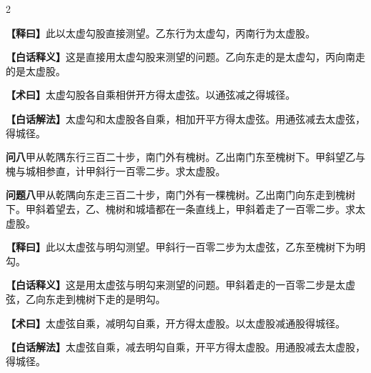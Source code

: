 \documentclass[11pt,a4paper]{article}
\newcommand{\WenQuestion}[1]{\textbf{\textcolor{classicalcolor}{#1}}}
\newcommand{\BaiQuestion}[1]{\textbf{\textcolor{moderncolor}{#1}}}
\newcommand{\WenExplain}{\textcolor{classicalcolor}{\textbf{【释曰】}}}
\newcommand{\BaiExplain}{\textcolor{moderncolor}{\textbf{【白话释义】}}}
\newcommand{\WenMethod}{\textcolor{classicalcolor}{\textbf{【术曰】}}}
\newcommand{\BaiMethod}{\textcolor{moderncolor}{\textbf{【白话解法】}}}
\begin{document}
\begin{paracol}{2}
\switchcolumn*
\begin{tcolorbox}[colback=red!5,colframe=red!30!black,boxrule=0.3pt]
\WenExplain\quad 此以太虚勾股直接测望。乙东行为太虚勾，丙南行为太虚股。
\end{tcolorbox}
\switchcolumn
\begin{tcolorbox}[colback=blue!5,colframe=blue!30!black,boxrule=0.3pt]
\BaiExplain\quad 这是直接用太虚勾股来测望的问题。乙向东走的是太虚勾，丙向南走的是太虚股。
\end{tcolorbox}

\switchcolumn*
\begin{tcolorbox}[colback=red!5,colframe=red!40!black,boxrule=0.3pt]
\WenMethod\quad 太虚勾股各自乘相併开方得太虚弦。以通弦减之得城径。
\end{tcolorbox}
\switchcolumn
\begin{tcolorbox}[colback=blue!5,colframe=blue!40!black,boxrule=0.3pt]
\BaiMethod\quad 太虚勾和太虚股各自乘，相加开平方得太虚弦。用通弦减去太虚弦，得城径。
\end{tcolorbox}

\vspace{0.8em}

\switchcolumn*
\begin{tcolorbox}[colback=red!3,colframe=red!30!black,boxrule=0.3pt]
\WenQuestion{问八}\quad 甲从乾隅东行三百二十步，南门外有槐树。乙出南门东至槐树下。甲斜望乙与槐与城相参直，计甲斜行一百零二步。求太虚股。
\end{tcolorbox}
\switchcolumn
\begin{tcolorbox}[colback=blue!3,colframe=blue!30!black,boxrule=0.3pt]
\BaiQuestion{问题八}\quad 甲从乾隅向东走三百二十步，南门外有一棵槐树。乙出南门向东走到槐树下。甲斜着望去，乙、槐树和城墙都在一条直线上，甲斜着走了一百零二步。求太虚股。
\end{tcolorbox}

\switchcolumn*
\begin{tcolorbox}[colback=red!5,colframe=red!30!black,boxrule=0.3pt]
\WenExplain\quad 此以太虚弦与明勾测望。甲斜行一百零二步为太虚弦，乙东至槐树下为明勾。
\end{tcolorbox}
\switchcolumn
\begin{tcolorbox}[colback=blue!5,colframe=blue!30!black,boxrule=0.3pt]
\BaiExplain\quad 这是用太虚弦与明勾来测望的问题。甲斜着走的一百零二步是太虚弦，乙向东走到槐树下走的是明勾。
\end{tcolorbox}

\switchcolumn*
\begin{tcolorbox}[colback=red!5,colframe=red!40!black,boxrule=0.3pt]
\WenMethod\quad 太虚弦自乘，减明勾自乘，开方得太虚股。以太虚股减通股得城径。
\end{tcolorbox}
\switchcolumn
\begin{tcolorbox}[colback=blue!5,colframe=blue!40!black,boxrule=0.3pt]
\BaiMethod\quad 太虚弦自乘，减去明勾自乘，开平方得太虚股。用通股减去太虚股，得城径。
\end{tcolorbox}

\end{paracol}
\end{document}
